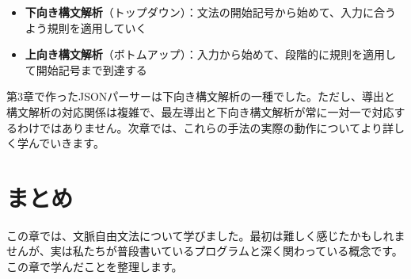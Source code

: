 \begin{itemize}
\tightlist
\item
  \textbf{下向き構文解析}（トップダウン）：文法の開始記号から始めて、入力に合うよう規則を適用していく
\item
  \textbf{上向き構文解析}（ボトムアップ）：入力から始めて、段階的に規則を適用して開始記号まで到達する
\end{itemize}

第3章で作ったJSONパーサーは下向き構文解析の一種でした。ただし、導出と構文解析の対応関係は複雑で、最左導出と下向き構文解析が常に一対一で対応するわけではありません。次章では、これらの手法の実際の動作についてより詳しく学んでいきます。

\hypertarget{chapter4-ux307eux3068ux3081}{%
\section{まとめ}\label{chapter4-ux307eux3068ux3081}}

この章では、文脈自由文法について学びました。最初は難しく感じたかもしれませんが、実は私たちが普段書いているプログラムと深く関わっている概念です。この章で学んだことを整理します。

